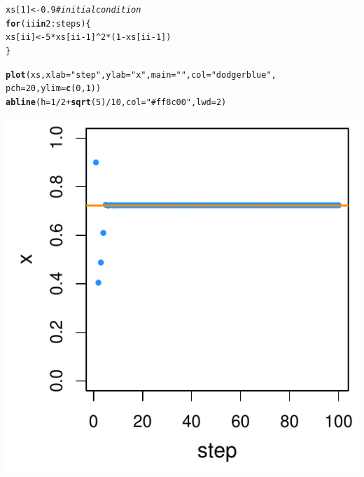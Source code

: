 \documentclass[a4paper]{article}\usepackage[]{graphicx}\usepackage[]{color}
\makeatletter
\def\maxwidth{ %
  \ifdim\Gin@nat@width>\linewidth
    \linewidth
  \else
    \Gin@nat@width
  \fi
}
\newcommand{\hlnum}[1]{\textcolor[rgb]{0.686,0.059,0.569}{#1}}%
\newcommand{\hlstr}[1]{\textcolor[rgb]{0.192,0.494,0.8}{#1}}%
\newcommand{\hlcom}[1]{\textcolor[rgb]{0.678,0.584,0.686}{\textit{#1}}}%
\newcommand{\hlopt}[1]{\textcolor[rgb]{0,0,0}{#1}}%
\newcommand{\hlstd}[1]{\textcolor[rgb]{0.345,0.345,0.345}{#1}}%
\newcommand{\hlkwa}[1]{\textcolor[rgb]{0.161,0.373,0.58}{\textbf{#1}}}%
\newcommand{\hlkwb}[1]{\textcolor[rgb]{0.69,0.353,0.396}{#1}}%
\newcommand{\hlkwc}[1]{\textcolor[rgb]{0.333,0.667,0.333}{#1}}%
\newcommand{\hlkwd}[1]{\textcolor[rgb]{0.737,0.353,0.396}{\textbf{#1}}}%
\newenvironment{kframe}{%
 \def\at@end@of@kframe{}%
 \ifinner\ifhmode%
  \def\at@end@of@kframe{\end{minipage}}%
  \begin{minipage}{\columnwidth}%
 \fi\fi%
 \def\FrameCommand##1{\hskip\@totalleftmargin \hskip-\fboxsep
 \colorbox{shadecolor}{##1}\hskip-\fboxsep
     \hskip-\linewidth \hskip-\@totalleftmargin \hskip\columnwidth}%
 \MakeFramed {\advance\hsize-\width
   \@totalleftmargin\z@ \linewidth\hsize
   \@setminipage}}%
 {\par\unskip\endMakeFramed%
 \at@end@of@kframe}
\newenvironment{knitrout}{}{} %
\makeatother
\begin{document}
\begin{knitrout}
\color{fgcolor}\begin{kframe}
\begin{alltt}
\hlstd{xs[}\hlnum{1}\hlstd{]} \hlkwb{<-} \hlnum{0.9}  \hlcom{# initial condition}
\hlkwa{for} \hlstd{(ii} \hlkwa{in} \hlnum{2}\hlopt{:}\hlstd{steps) \{}
    \hlstd{xs[ii]} \hlkwb{<-} \hlnum{5} \hlopt{*} \hlstd{xs[ii} \hlopt{-} \hlnum{1}\hlstd{]}\hlopt{^}\hlnum{2} \hlopt{*} \hlstd{(}\hlnum{1} \hlopt{-} \hlstd{xs[ii} \hlopt{-} \hlnum{1}\hlstd{])}
\hlstd{\}}
\end{alltt}
\end{kframe}
\end{knitrout}


\begin{knitrout}
\color{fgcolor}\begin{kframe}
\begin{alltt}
\hlkwd{plot}\hlstd{(xs,} \hlkwc{xlab} \hlstd{=} \hlstr{"step"}\hlstd{,} \hlkwc{ylab} \hlstd{=} \hlstr{"x"}\hlstd{,} \hlkwc{main} \hlstd{=} \hlstr{""}\hlstd{,} \hlkwc{col} \hlstd{=} \hlstr{"dodgerblue"}\hlstd{,}
    \hlkwc{pch} \hlstd{=} \hlnum{20}\hlstd{,} \hlkwc{ylim} \hlstd{=} \hlkwd{c}\hlstd{(}\hlnum{0}\hlstd{,} \hlnum{1}\hlstd{))}
\hlkwd{abline}\hlstd{(}\hlkwc{h} \hlstd{=} \hlnum{1}\hlopt{/}\hlnum{2} \hlopt{+} \hlkwd{sqrt}\hlstd{(}\hlnum{5}\hlstd{)}\hlopt{/}\hlnum{10}\hlstd{,} \hlkwc{col} \hlstd{=} \hlstr{"#ff8c00"}\hlstd{,} \hlkwc{lwd} \hlstd{=} \hlnum{2}\hlstd{)}
\end{alltt}
\end{kframe}

{\centering \includegraphics[width=\maxwidth]{figure/minimal-unnamed-chunk-4-1} 

}



\end{knitrout}
\end{document}

